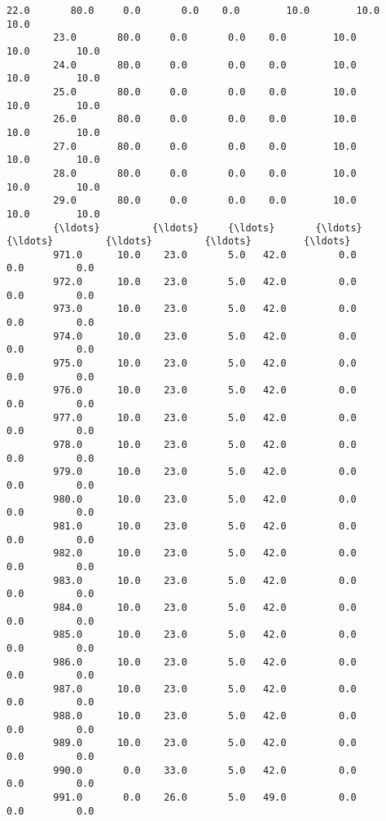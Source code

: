 \documentclass[11pt]{article}
\begin{document}
\begin{Verbatim}[commandchars=\\\{\}]
        22.0       80.0     0.0       0.0    0.0        10.0        10.0        10.0   
        23.0       80.0     0.0       0.0    0.0        10.0        10.0        10.0   
        24.0       80.0     0.0       0.0    0.0        10.0        10.0        10.0   
        25.0       80.0     0.0       0.0    0.0        10.0        10.0        10.0   
        26.0       80.0     0.0       0.0    0.0        10.0        10.0        10.0   
        27.0       80.0     0.0       0.0    0.0        10.0        10.0        10.0   
        28.0       80.0     0.0       0.0    0.0        10.0        10.0        10.0   
        29.0       80.0     0.0       0.0    0.0        10.0        10.0        10.0   
        {\ldots}         {\ldots}     {\ldots}       {\ldots}    {\ldots}         {\ldots}         {\ldots}         {\ldots}   
        971.0      10.0    23.0       5.0   42.0         0.0         0.0         0.0   
        972.0      10.0    23.0       5.0   42.0         0.0         0.0         0.0   
        973.0      10.0    23.0       5.0   42.0         0.0         0.0         0.0   
        974.0      10.0    23.0       5.0   42.0         0.0         0.0         0.0   
        975.0      10.0    23.0       5.0   42.0         0.0         0.0         0.0   
        976.0      10.0    23.0       5.0   42.0         0.0         0.0         0.0   
        977.0      10.0    23.0       5.0   42.0         0.0         0.0         0.0   
        978.0      10.0    23.0       5.0   42.0         0.0         0.0         0.0   
        979.0      10.0    23.0       5.0   42.0         0.0         0.0         0.0   
        980.0      10.0    23.0       5.0   42.0         0.0         0.0         0.0   
        981.0      10.0    23.0       5.0   42.0         0.0         0.0         0.0   
        982.0      10.0    23.0       5.0   42.0         0.0         0.0         0.0   
        983.0      10.0    23.0       5.0   42.0         0.0         0.0         0.0   
        984.0      10.0    23.0       5.0   42.0         0.0         0.0         0.0   
        985.0      10.0    23.0       5.0   42.0         0.0         0.0         0.0   
        986.0      10.0    23.0       5.0   42.0         0.0         0.0         0.0   
        987.0      10.0    23.0       5.0   42.0         0.0         0.0         0.0   
        988.0      10.0    23.0       5.0   42.0         0.0         0.0         0.0   
        989.0      10.0    23.0       5.0   42.0         0.0         0.0         0.0   
        990.0       0.0    33.0       5.0   42.0         0.0         0.0         0.0   
        991.0       0.0    26.0       5.0   49.0         0.0         0.0         0.0   

\end{Verbatim}
\end{document}
